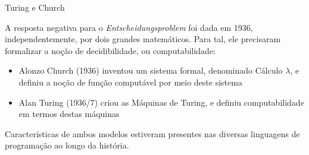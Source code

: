 \begin{frame}[fragile]{Turing e Church}

    A resposta negativa para o \textit{Entscheidungsproblem} foi dada em 1936, independentemente,
    por dois grandes matemáticos. Para tal, ele precisaram formalizar a noção de 
    decidibilidade, ou computabilidade:

    \vspace{0.2in}

    \begin{itemize}
        \item Alonzo Church (1936) inventou um sistema formal, denominado Cálculo $\lambda$,
            e definiu a noção de função computável por meio deste sistema
        \item Alan Turing (1936/7) criou as Máquinas de Turing, e definiu computabilidade em termos
            destas máquinas
    \end{itemize}

    \vspace{0.2in}

    Características de ambos modelos estiveram presentes nas diversas linguagens de programação
    ao longo da história.

\end{frame}
